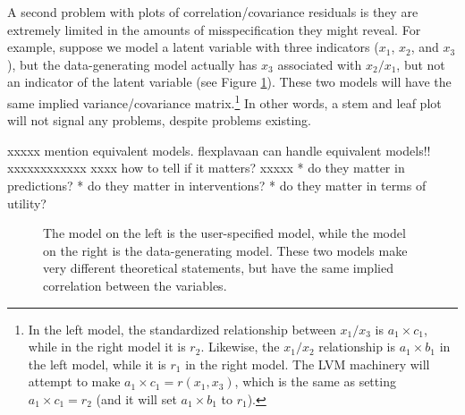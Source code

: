 \documentclass[
  english,
  doc]{apa6}
\begin{document}
A second problem with plots of correlation/covariance residuals is they are extremely limited in the amounts of misspecification they might reveal. For example, suppose we model a latent variable with three indicators (\(x_1\), \(x_2\), and \(x_3\)), but the data-generating model actually has \(x_3\) associated with \(x_2/x_1\), but not an indicator of the latent variable (see Figure \ref{fig:implied}). These two models will have the same implied variance/covariance matrix.\footnote{In the left model, the standardized relationship between \(x_1/x_3\) is \(a_1\times c_1\), while in the right model it is \(r_2\). Likewise, the \(x_1/x_2\) relationship is \(a_1\times b_1\) in the left model, while it is \(r_1\) in the right model. The LVM machinery will attempt to make \(a_1\times c_1 = r(x_1, x_3)\), which is the same as setting \(a_1\times c_1 = r_2\) (and it will set \(a_1\times b_1\) to \(r_1\)).} In other words, a stem and leaf plot will not signal any problems, despite problems existing.

xxxxx mention equivalent models. flexplavaan can handle equivalent models!! xxxxxxxxxxxx
xxxx how to tell if it matters? xxxxx
* do they matter in predictions?
* do they matter in interventions?
* do they matter in terms of utility?

\begin{figure}
\begin{center}
\end{center}
\caption{The model on the left is the user-specified model, while the model on the right is the data-generating model. These two models make very different theoretical statements, but have the same implied correlation between the variables.}
\label{fig:implied}
\end{figure}
\end{document}
